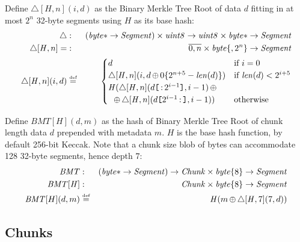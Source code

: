 \begin{definition}
\label{def:bmtroot}
Define  $\triangle[\mathit{H},n](i,d)$ as the Binary Merkle Tree Root of data $d$ fitting in at most $2^n$ 32-byte segments using $\mathit{H}$ as its base hash:
%
\begin{eqnarray}
\triangle&: &(\mathit{byte}{*}\to\mathit{Segment})\times\mathit{uint8}\to\mathit{uint8}\times\mathit{byte}{*} \to \mathit{Segment} 
\\
\triangle[\mathit{H},n]=&:&\overline{0,n}\times\mathit{byte}\{,2^{n}\}\to \mathit{Segment} \\
\triangle[\mathit{H},n](i,d) &\overset{\textrm{\tiny def}}{=} &\begin{cases}d &\text{if }i=0
\\
\triangle[\mathit{H},n](i,d\operatorname{\operatorname{\oplus}} 0\{2^{n+5}-\mathit{len}(d)\})& \text{if }\mathit{len}(d)<2^{i+5} \\
\mathit{H}(\triangle[\mathit{H},n](d\texttt{[}\/\operatorname{:} 2^{i-1}\/\texttt{]},i-1)\operatorname{\operatorname{\oplus}}\\
\ \ \operatorname{\operatorname{\oplus}}  \triangle[\mathit{H},n](d\texttt{[}\/2^{i-1}\operatorname{:}\/\texttt{]},i-1)) & \text{otherwise }
\end{cases}
\end{eqnarray}
\end{definition}

\begin{definition}
\label{def:bmt}
Define  $\mathit{BMT}[H](d,m)$ as the hash of Binary Merkle Tree Root of chunk length data $d$ prepended with metadata $m$.  $H$ is the base hash function, by default 256-bit Keccak. Note that a chunk size blob of bytes can accommodate 128 32-byte segments, hence  depth $7$:
%
\begin{eqnarray}
\mathit{BMT}&:&(\mathit{byte}{*}\to\mathit{Segment})\to  \mathit{Chunk}\times\mathit{byte}\{8\}\to\mathit{Segment}\\
\mathit{BMT}[\mathit{H}] &:&\mathit{Chunk}\times\mathit{byte}\{8\}\to\mathit{Segment}\\
\mathit{BMT}[H](d,m)&\overset{\textrm{\tiny def}}{=}&\mathit{H}(m\operatorname{\operatorname{\oplus}} \triangle[\mathit{H},7](7,d))
\end{eqnarray}

\end{definition}

\subsection{Chunks}

